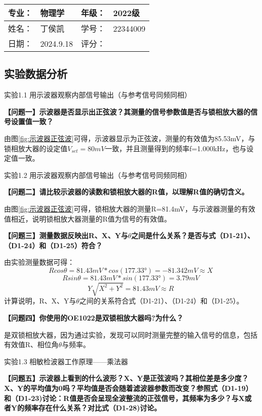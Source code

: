 \documentclass[dvipsnames, svgnames,a4paper,11pt]{article}
\begin{document}
	\clearpage
\begin{table}
	\renewcommand\arraystretch{1.7}
	\begin{tabularx}{\textwidth}{|X|X|X|X|}
	\hline
	专业：& 物理学 &年级：& 2022级\\
	\hline
	姓名： &丁侯凯 & 学号：&22344009 \\
	\hline
    日期：&2024.9.18 & 评分： &\\
	\hline
	\end{tabularx}
\end{table}

\subsection{实验数据分析}
	实验1.1 \quad  用示波器观察内部信号输出（与参考信号同频同相）

	\textbf{【问题一】示波器是否显示出正弦波？其测量的信号参数值是否与锁相放大器的信号设置值一致？}

	由图\ref{fig:示波器正弦波}可得，示波器显示为正弦波，测量的有效值为85.53mV，与锁相放大器的设定值$V_{set}=80mV$一致，并且测量得到的频率f=1.000kHz，也与设定值一致。

	实验1.2 \quad  用示波器观察内部信号输出（与参考信号同频同相）

	\textbf{【问题二】请比较示波器的读数和锁相放大器的R值，以理解R值的确切含义。}

	由图\ref{fig:示波器正弦波}可得，锁相放大器的测量R=81.4mV，与示波器测量的有效值相近，说明锁相放大器测量的R值为信号的有效值。

	\textbf{【问题三】测量数据反映出R、X、Y与$\theta$之间是什么关系？是否与式（D1-21）、（D1-24）和（D1-25）符合？}

	由实验测量数据可得：
	$$
	Rcos\theta=81.43mV *cos(177.33°) = -81.342mV \approx X
	$$
	$$
	Rsin\theta=81.43mV *sin(177.33°) = 3.79mV  
	$$
	$$
	Y\sqrt{X^2 + Y^2} =81.43mV \approx R
	$$
	计算说明，R、X、Y与$\theta$之间的关系符合式（D1-21）、（D1-24）和（D1-25）。

	\textbf{【问题四】你使用的OE1022是双锁相放大器吗?为什么？}

	是双锁相放大器，因为通过实验，发现可以同时测量完整的输入信号的信息，包括有效值R、相位角$\theta$与频率。

	实验1.3 \quad   相敏检波器工作原理——乘法器

	\textbf{【问题五】示波器上看到的什么波形？X、Y是正弦波吗？其相位差是多少度？X、Y的平均值为0吗？平均值是否会随着滤波器参数而改变？参照式（D1-19）和（D1-23)讨论：R值是否会呈现全波整流的正弦信号，其频率为多少？与X或者Y的频率存在什么关系？对比式（D1-28)讨论。}
\end{document}
